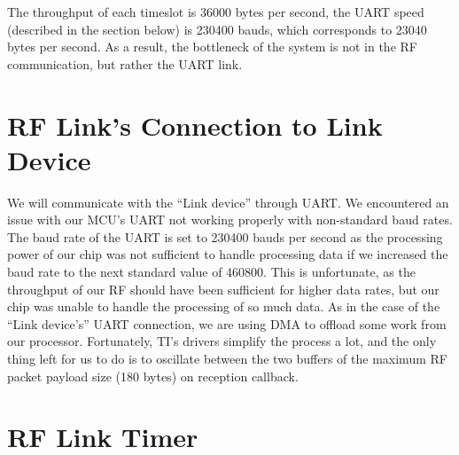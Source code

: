 The throughput of each timeslot is 36000 bytes per second, the UART speed (described in the section below) is 230400 bauds, which corresponds to 23040 bytes per second. As a result, the bottleneck of the system is not in the RF communication, but rather the UART link. 

\section{RF Link's Connection to Link Device}

We will communicate with the “Link device” through UART. We encountered an issue with our MCU’s UART not working properly with non-standard baud rates. The baud rate of the UART is set to 230400 bauds per second as the processing power of our chip was not sufficient to handle processing data if we increased the baud rate to the next standard value of 460800. This is unfortunate, as the throughput of our RF should have been sufficient for higher data rates, but our chip was unable to handle the processing of so much data. As in the case of the “Link device’s” UART connection, we are using DMA to offload some work from our processor. Fortunately, TI’s drivers simplify the process a lot, and the only thing left for us to do is to oscillate between the two buffers of the maximum RF packet payload size (180 bytes) on reception callback. 

\section{RF Link Timer}

